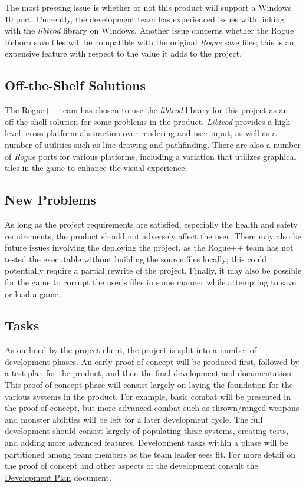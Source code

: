 \documentclass[12pt, titlepage]{article}
\begin{document}
	The most pressing issue is whether or not this product will support a Windows 10 port.  Currently, the development team has experienced issues with linking with the \textit{libtcod} library on Windows.  Another issue concerns whether the Rogue Reborn save files will be compatible with the original \textit{Rogue} save files; this is an expensive feature with respect to the value it adds to the project. 

	\subsection{Off-the-Shelf Solutions}

	The Rogue++ team has chosen to use the \textit{libtcod} library for this project as an off-the-shelf solution for some problems in the product.  \textit{Libtcod} provides a high-level, cross-platform abstraction over rendering and user input, as well as a number of utilities such as line-drawing and pathfinding.  There are also a number of \textit{Rogue} ports for various platforms, including a variation that utilizes graphical tiles in the game to enhance the visual experience.

	\subsection{New Problems}

	As long as the project requirements are satisfied, especially the health and safety requirements, the product should not adversely affect the user.  There may also be future issues involving the deploying the project, as the Rogue++ team has not tested the executable without building the source files locally; this could potentially require a partial rewrite of the project.  Finally, it may also be possible for the game to corrupt the user's files in some manner while attempting to save or load a game.

	\subsection{Tasks}

	As outlined by the project client, the project is split into a number of development phases.  An early proof of concept will be produced first, followed by a test plan for the product, and then the final development and documentation.  This proof of concept phase will consist largely on laying the foundation for the various systems in the product.  For example, basic combat will be presented in the proof of concept, but more advanced combat such as thrown/ranged weapons and monster abilities will be left for a later development cycle.  The full development should consist largely of populating these systems, creating tests, and adding more advanced features.  Development tasks within a phase will be partitioned among team members as the team leader sees fit.  For more detail on the proof of concept and other aspects of the development consult the \href{../DevelopmentPlan/DevelopmentPlan.pdf}{Development Plan} document.
\end{document}
